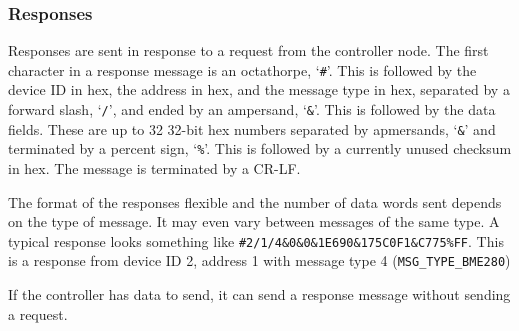 \documentclass[10pt, openany, draft]{article}
\begin{document}
\subsubsection{Responses}
Responses are sent in response to a request from the controller node.  The first character in a response message is an octathorpe, `\texttt{\#}'.  This is followed by the device ID in hex, the address in hex, and the message type in hex, separated by a forward slash, `\texttt{/}', and ended by an ampersand, `\texttt{\&}'.  This is followed by the data fields.  These are up to 32 32-bit hex numbers separated by apmersands, `\texttt{\&}' and terminated by a percent sign, `\texttt{\%}'.  This is followed by a currently unused checksum in hex.  The message is terminated by a CR-LF.

The format of the responses flexible and the number of data words sent depends on the type of message.  It may even vary between messages of the same type.  A typical response looks something like \texttt{\#2/1/4\&0\&0\&1E690\&175C0F1\&C775\%FF}.  This is a response from device ID 2, address 1 with message type 4 (\texttt{MSG\_TYPE\_BME280})

If the controller has data to send, it can send a response message without sending a request.
\end{document}
